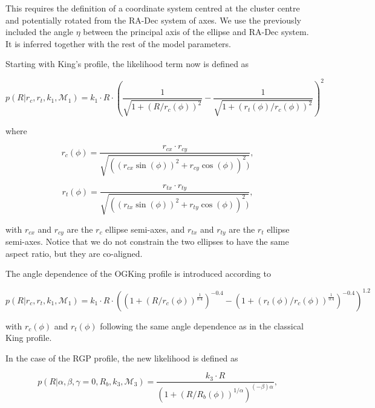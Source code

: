 This requires the definition of a coordinate system centred at the cluster centre and potentially rotated from the RA-Dec system of axes. We use the previously included the angle $\eta$ between the principal axis of the ellipse and RA-Dec system.  It is inferred together with the rest of the model parameters.

Starting with King's profile, the likelihood term now is defined as
 
\begin{equation}
  p(R|r_c, r_t, k_1,\mathcal{M}_1)=
  k_1\cdot R \cdot
  \left(\frac{1}{\sqrt{1+(R/r_c(\phi))^2}} - \frac{1}{\sqrt{1+(r_t(\phi)/r_c(\phi))^2}}\right)^2
\label{eq:KingEll}
\end{equation}

where


\begin{equation}
r_c(\phi) = \frac{r_{cx}\cdot r_{cy}}{\sqrt{((r_{cx}\sin(\phi))^2+r_{cy}\cos(\phi))^2)}},
\label{eq:anglerc}
\end{equation}

\begin{equation}
r_t(\phi) = \frac{r_{tx}\cdot r_{ty}}{\sqrt{((r_{tx}\sin(\phi))^2+r_{ty}\cos(\phi))^2)}},
\label{eq:anglert}
\end{equation}

with $r_{cx}$ and $r_{cy}$ are the $r_c$ ellipse semi-axes, and $r_{tx}$ and $r_{ty}$ are the $r_t$ ellipse semi-axes. Notice that we do not constrain the two ellipses to have the same aspect ratio, but they are co-aligned.

The angle dependence of the OGKing profile is introduced according to

\begin{equation}
    p(R|r_c, r_t, k_1,\mathcal{M}_1)=
    k_1\cdot R \cdot
  \left(
  \left(1+(R/r_c(\phi))^{\frac{1}{0.4}}\right)^{-0.4}
  -
  \left(1+(r_t(\phi)/r_c(\phi))^{\frac{1}{0.4}}\right)^{-0.4}
  \right)^{1.2}
\end{equation}

with $r_c(\phi)$ and $r_t(\phi)$ following the same angle dependence as in the classical King profile.

In the case of the RGP profile, the new likelihood is defined as

\begin{equation}
  p(R| \alpha, \beta, \gamma=0, R_b, k_3,\mathcal{M}_3 ) = \frac
  {k_3\cdot R} {(1+(R/R_b(\phi))^{1/\alpha})^{(-\beta)\alpha}},
  \label{eq:EllRGP}
\end{equation}

